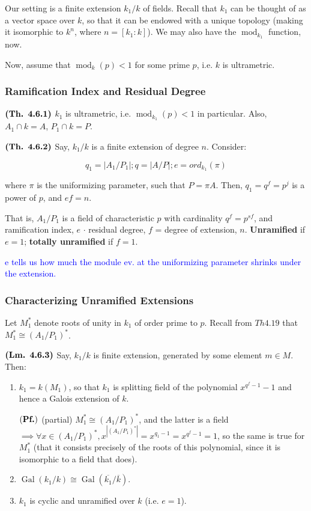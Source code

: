 \documentclass{article}
\DeclareMathOperator{\modl}{mod}
\DeclareMathOperator{\Gal}{Gal}
\begin{document}
Our setting is a finite extension $k_1/k$ of fields. Recall that $k_1$ can be thought of as a vector space over $k$, so that it can be endowed with a unique topology (making it isomorphic to $k^n$, where $n = [k_1:k]$). We may also have the $\modl_{k_1}$ function, now.

Now, assume that $\modl_k(p) < 1$ for some prime $p$, i.e. $k$ is ultrametric.

\subsubsection*{Ramification Index and Residual Degree}

$\textbf{(Th. 4.6.1)}$ $k_1$ is ultrametric, i.e. $\modl_{k_1}(p) < 1$ in particular. Also, $A_1 \cap k = A$, $P_1 \cap k = P$.

$\textbf{(Th. 4.6.2)}$ Say, $k_1/k$ is a finite extension of degree $n$. Consider:

$$q_1 = |A_1/P_1|; q = |A/P|; e = ord_{k_1}(\pi)$$

where $\pi$ is the uniformizing parameter, such that $P = \pi A$. Then, $q_1 = q^f = p^j$ is a power of $p$, and $ef = n$.

That is, $A_1/P_1$ is a field of characteristic $p$ with cardinality $q^f = p^{sf}$, and ramification index, $e$ $\cdot$ residual degree, $f$ = degree of extension, $n$. \textbf{Unramified} if $e = 1$; \textbf{totally unramified} if $f = 1$.

\textcolor{blue}{e tells us how much the module ev. at the uniformizing parameter shrinks under the extension.}

\subsubsection*{Characterizing Unramified Extensions}
Let $M_1^*$ denote roots of unity in $k_1$ of order prime to $p$. Recall from $Th 4.19$ that $M_1^* \cong (A_1/P_1)^*$.

$\textbf{(Lm. 4.6.3)}$ Say, $k_1/k$ is finite extension, generated by some element $m \in M$. Then:

\begin{enumerate}
    \item $k_1 = k(M_1)$, so that $k_1$ is splitting field of the polynomial $x^{q^f-1}-1$ and hence a Galois extension of $k$.
    
    $(\textbf{Pf.})$ (partial) $M_1^* \cong (A_1/P_1)^*$, and the latter is a field $\implies \forall x \in (A_1/P_1)^*, x^{|(A_1/P_1)^*|} = x^{q_1 - 1} = x^{q^f - 1} = 1$, so the same is true for $M_1^*$ (that it consists precisely of the roots of this polynomial, since it is isomorphic to a field that does).

    \item $\Gal(k_1/k) \cong \Gal(\overline{k_1}/\overline{k})$.

    \item $k_1$ is cyclic and unramified over $k$ (i.e. $e = 1$).
\end{enumerate}
\end{document}
